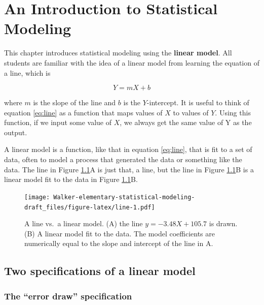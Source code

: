 \documentclass[]{book}
\begin{document}
\hypertarget{an-introduction-to-statistical-modeling}{%
\chapter{An Introduction to Statistical Modeling}\label{an-introduction-to-statistical-modeling}}

This chapter introduces statistical modeling using the \textbf{linear model}. All students are familiar with the idea of a linear model from learning the equation of a line, which is

\begin{equation}
Y = mX + b
\label{eq:line}
\end{equation}

where \(m\) is the slope of the line and \(b\) is the \(Y\)-intercept. It is useful to think of equation \eqref{eq:line} as a function that maps values of \(X\) to values of \(Y\). Using this function, if we input some value of \(X\), we always get the same value of Y as the output.

A linear model is a function, like that in equation \eqref{eq:line}, that is fit to a set of data, often to model a process that generated the data or something like the data. The line in Figure \ref{fig:line}A is just that, a line, but the line in Figure \ref{fig:line}B is a linear model fit to the data in Figure \ref{fig:line}B.

\begin{figure}
\centering
\texttt{[image: Walker-elementary-statistical-modeling-draft\_files/figure-latex/line-1.pdf]}
\caption{\label{fig:line}A line vs.~a linear model. (A) the line \(y=-3.48X + 105.7\) is drawn. (B) A linear model fit to the data. The model coefficients are numerically equal to the slope and intercept of the line in A.}
\end{figure}

\hypertarget{two-specifications-of-a-linear-model}{%
\section{Two specifications of a linear model}\label{two-specifications-of-a-linear-model}}

\hypertarget{the-error-draw-specification}{%
\subsection{The ``error draw'' specification}\label{the-error-draw-specification}}
\end{document}
